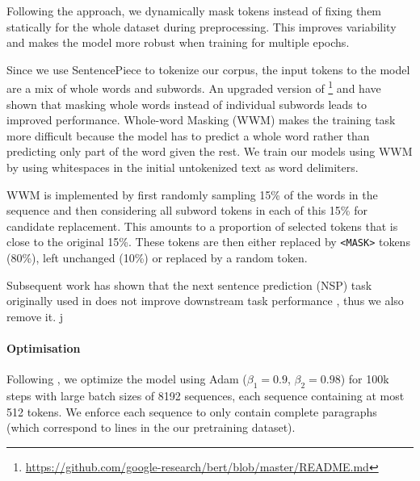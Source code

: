Following the \roberta approach, we dynamically mask tokens instead of fixing them statically for the whole dataset during preprocessing. This improves variability and makes the model more robust when training for multiple epochs.

Since we use SentencePiece to tokenize our corpus, the input tokens to the model are a mix of whole words and subwords.
An upgraded version of \bert\footnote{\url{https://github.com/google-research/bert/blob/master/README.md}} and \citet{joshi2019spanbert} have shown that masking whole words instead of individual subwords leads to improved performance.
Whole-word Masking (WWM) makes the training task more difficult because the model has to predict a whole word rather than predicting only part of the word given the rest.
We train our models using WWM by using whitespaces in the initial untokenized text as word delimiters.

WWM is implemented by first randomly sampling 15\% of the words in the sequence and then considering all subword tokens in each of this 15\% for candidate replacement. This amounts to a proportion of selected tokens that is close to the original 15\%.
These tokens are then either replaced by \texttt{<MASK>} tokens (80\%), left unchanged (10\%) or replaced by a random token.

Subsequent work has shown that the next sentence prediction (NSP) task originally used in \bert does not improve downstream task performance \cite{conneau-lample-2019-cross,liu-etal-2019-roberta}, thus we also remove it.
j


\paragraph{Optimisation}
Following \citep{liu-etal-2019-roberta}, we optimize the model using Adam \cite{kingma2014adam} ($\beta_1 = 0.9$, $\beta_2 = 0.98$) for 100k steps with large batch sizes of 8192 sequences, each sequence containing at most 512 tokens.
We enforce each sequence to only contain complete paragraphs (which correspond to lines in the our pretraining dataset).

